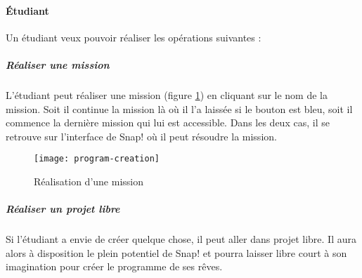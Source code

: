 \paragraph{Étudiant}
Un étudiant veux pouvoir réaliser les opérations suivantes :
\subparagraph{Réaliser une mission} L'étudiant peut réaliser une mission (figure \ref{fig:program-creation}) en cliquant sur le nom de la mission. Soit il continue la mission là où il l'a laissée si le bouton est bleu, soit il commence la dernière mission qui lui est accessible. Dans les deux cas, il se retrouve sur l'interface de Snap! où il peut résoudre la mission.
\begin{figure}
  \begin{center}
    \texttt{[image: program-creation]}
    \caption{Réalisation d'une mission}
    \label{fig:program-creation}
  \end{center}
\end{figure}

\subparagraph{Réaliser un projet libre} Si l'étudiant a envie de créer quelque chose, il peut aller dans projet libre. Il aura alors à disposition le plein potentiel de Snap! et pourra laisser libre court à son imagination pour créer le programme de ses rêves.
